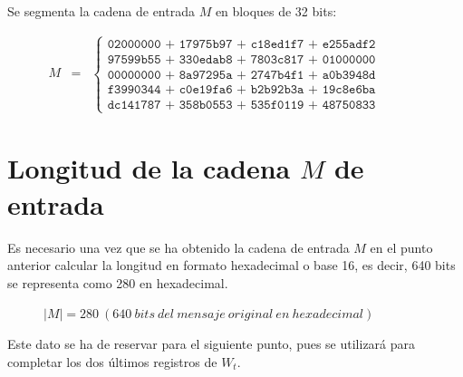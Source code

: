 \documentclass{article}
\begin{document}
    Se segmenta la cadena de entrada $M$ en bloques de 32 bits:
    \begin{figure}[H]
    \centering
        $\begin{array}{rcl}
             M & = & \left \{
            \begin{array}{c}
                \texttt{02000000 + 17975b97 + c18ed1f7 + e255adf2} \\
                \texttt{97599b55 + 330edab8 + 7803c817 + 01000000} \\
                \texttt{00000000 + 8a97295a + 2747b4f1 + a0b3948d} \\
                \texttt{f3990344 + c0e19fa6 + b2b92b3a + 19c8e6ba} \\
                \texttt{dc141787 + 358b0553 + 535f0119 + 48750833}
            \end{array}
            \right .
        \end{array}$
    \end{figure}

\section{Longitud de la cadena $M$ de entrada}
    Es necesario una vez que se ha obtenido la cadena de entrada $M$ en el punto anterior calcular la longitud en formato hexadecimal o base 16, es decir, 640 bits se representa como 280 en hexadecimal.
    \begin{figure}[H]
    \centering
        $|M| = 280\ (640\ bits\ del\ mensaje\ original\ en\ hexadecimal)$
    \end{figure}
    Este dato se ha de reservar para el siguiente punto, pues se utilizará para completar los dos últimos registros de $W_t$.
    
\end{document}
